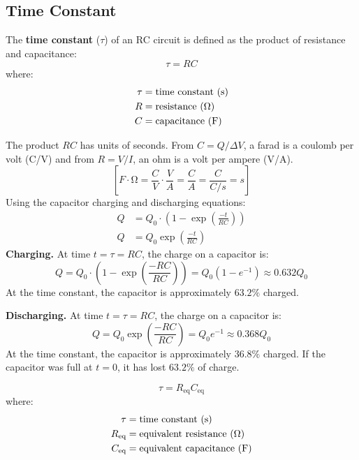\documentclass{article}
\newcommand{\theorem}[2]{\begin{tcolorbox}[title={#1},colback=blue!5!white,colframe=blue!75!black,parbox=false] #2 \end{tcolorbox}}
\newcommand{\defitheorem}[2]{\begin{tcolorbox}[title={#1},colback=violet!5!white,colframe=violet!75!black,parbox=false] #2 \end{tcolorbox}}
\begin{document}
\subsection{Time Constant}

\defitheorem{Time constant}{
	The \textbf{time constant} ($\tau$) of an RC circuit is defined as the product of resistance and capacitance:
	\begin{equation*}
	    \tau=RC
	\end{equation*}
	where:
	\begin{align*}
		\tau&=\text{time constant (s)} \\
		R&=\text{resistance (\si{\ohm})} \\
		C&=\text{capacitance (F)}
	\end{align*}
}

The product $RC$ has units of seconds. From $C=Q/\Delta V$, a farad is a coulomb per volt (C/V) and from $R=V/I$, an ohm is a volt per ampere (V/A).
\begin{equation*}
    \left[ 
		\si{F\cdot\ohm}
		=\frac{\si{C}}{\si{V}}\cdot \frac{\si{V}}{\si{A}}
		=\frac{\si{C}}{\si{A}}
		=\frac{\si{C}}{\si{C/s}}
		=\si{s}
	\right]
\end{equation*}
Using the capacitor charging and discharging equations:
\begin{align*}
	Q&=Q_0\cdot \left( 1-\exp \left( \frac{-t}{RC} \right) \right) \\
	Q&=Q_0\exp \left( \frac{-t}{RC} \right)
\end{align*}
\textbf{Charging.} At time $t=\tau=RC$, the charge on a capacitor is:
\begin{equation*}
	Q
	=Q_0\cdot \left( 1-\exp \left( \frac{-RC}{RC} \right) \right)
	=Q_0(1-e^{-1})
	\approx 0.632Q_0
\end{equation*}
At the time constant, the capacitor is approximately $63.2\%$ charged.

\textbf{Discharging.} At time $t=\tau=RC$, the charge on a capacitor is:
\begin{equation*}
	Q
	=Q_0\exp \left( \frac{-RC}{RC} \right)
	=Q_0e^{-1}
	\approx 0.368Q_0
\end{equation*}
At the time constant, the capacitor is approximately $36.8\%$ charged. If the capacitor was full at $t=0$, it has lost $63.2\%$ of charge.

\theorem{Time constant with multiple resistors and capacitors}{
	\begin{equation*}
		\tau=R_\text{eq}C_\text{eq}
	\end{equation*}
	where:
	\begin{align*}
		\tau&=\text{time constant (s)} \\
		R_\text{eq}&=\text{equivalent resistance (\si{\ohm})} \\
		C_\text{eq}&=\text{equivalent capacitance (F)}
	\end{align*}
}
\end{document}
